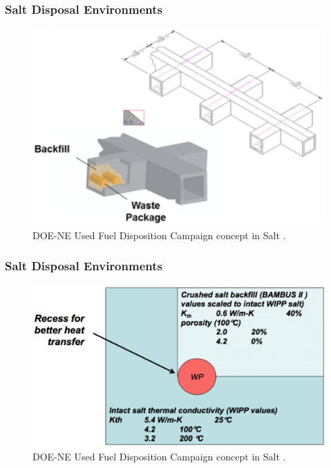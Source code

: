 \begin{frame}[ctb!]
  \frametitle{Salt Disposal Environments}
  \footnotesize{

  \begin{figure}[h!]
    \begin{center}
      \includegraphics[height=.7\textheight]{carter_salt_layout.eps}
    \end{center}
    \caption{DOE-NE Used Fuel Disposition Campaign  concept in 
    Salt \cite{hardin_generic_2011}.}
    \label{fig:salt_layout}
  \end{figure}
}
\end{frame}
\begin{frame}[ctb!]
  \frametitle{Salt Disposal Environments}
  \footnotesize{

  \begin{figure}[h!]
    \begin{center}
      \includegraphics[height=.7\textheight]{hardin_salt_layout.eps}
    \end{center}
    \caption{DOE-NE Used Fuel Disposition Campaign  concept in 
    Salt \cite{hardin_generic_2011}.}
    \label{fig:hardin_salt_layout}
  \end{figure}
}
\end{frame}

